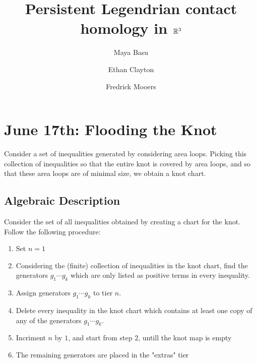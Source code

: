 \documentclass[11pt]{amsart}
\begin{document}
\author{Maya Basu}
\author{Ethan Clayton}
\author{Fredrick Mooers}

\address{University of California, Berkeley}

\address{University of Illinois, Urbana-Champaign}

\address{Virginia Tech}

\title{Persistent Legendrian contact homology in $\mathbb R^3$}




\maketitle

\tableofcontents
\newpage

\section{June 17th: Flooding the Knot}



\begin{definition}
    Consider a set of inequalities generated by considering area loops. Picking this collection of inequalities so that the entire knot is covered by area loops, and so that these area loops are of minimal size, we obtain a knot chart.
\end{definition}

\subsection{Algebraic Description}
Consider the set of all inequalities obtained by creating a chart for the knot. Follow the following procedure:

\begin{enumerate}
    \item Set $n = 1$
    \item Considering the (finite) collection of inequalities in the knot chart, find the generators $g_1 \cdots g_k$ which are only listed as positive terms in every inequality.
    \item Assign generators $g_1 \cdots g_k$ to tier $n$.
    \item Delete every inequality in the knot chart which contains at least one copy of any of the generators $g_1 \cdots g_k$.
    \item Incriment $n$ by $1$, and start from step $2$, untill the knot map is empty
    \item The remaining generators are placed in the "extras" tier
\end{enumerate}
\end{document}

